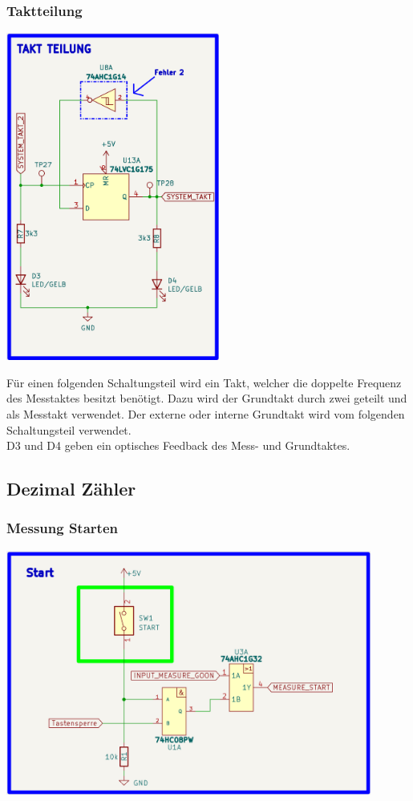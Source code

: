\newpage

\subsubsection{Taktteilung}

\begin{center}
\includegraphics[width=7cm]{Bilder/Taktteilung.png}
\end{center}

Für einen folgenden Schaltungsteil wird ein Takt, welcher die doppelte Frequenz des Messtaktes besitzt benötigt. Dazu wird der Grundtakt durch zwei geteilt und als Messtakt verwendet. Der externe oder interne Grundtakt wird vom folgenden Schaltungsteil verwendet.
\\
D3 und D4 geben ein optisches Feedback des Mess- und Grundtaktes. 


\subsection{Dezimal Zähler}

\subsubsection{Messung Starten}

\begin{center}
\includegraphics[width=12cm]{Bilder/Start.png}
\end{center}

